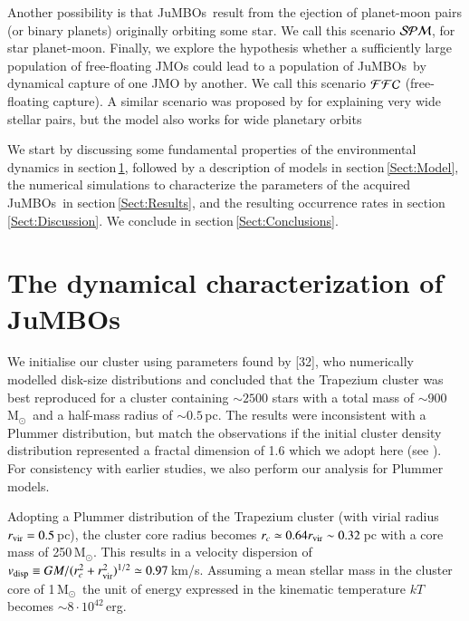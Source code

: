 \documentclass[submission,phys]{lib/SciPost}
\newcommand{\MSun}{\mbox{$\mathrm{{M}}_\odot$}}
\newcommand{\jumbos}{\mbox{JuMBOs}}
\begin{document}
Another possibility is that \jumbos\, result from the ejection of planet-moon
pairs (or binary planets) originally orbiting some star.  We call this 
scenario ${\cal SPM}$, for star planet-moon.
Finally, we explore the hypothesis whether a sufficiently large
population of free-floating JMOs could lead to a
population of \jumbos\, by dynamical capture of one JMO by another.
We call this scenario ${\cal FFC}$ (free-floating capture). A similar
scenario was proposed by \cite{2010MNRAS.404.1835K} for explaining
very wide stellar pairs, but the model also works for
wide planetary orbits \cite{2012ApJ...750...83P,2018MNRAS.473.1589G}

We start by discussing some fundamental properties of the
environmental dynamics in section\,\ref{Sect:Characterize}, followed
by a description of models in section\,\ref{Sect:Model}, the numerical
simulations to characterize the parameters of the acquired \jumbos\,
in section\,\ref{Sect:Results}, and the resulting occurrence rates in
section\,\ref{Sect:Discussion}. We conclude in
section\,\ref{Sect:Conclusions}.

\section{The dynamical characterization of \jumbos}\label{Sect:Characterize}

We initialise our cluster using parameters found by [32], who numerically 
modelled disk-size distributions and concluded that the Trapezium cluster was best 
reproduced for a cluster containing $\sim 2500$ stars with a total mass of 
$\sim 900$\,\MSun\, and a half-mass radius of $\sim 0.5$\,pc. The results were
inconsistent with a Plummer \cite{1911MNRAS..71..460P} distribution,
but match the observations if the initial cluster density distribution
represented a fractal dimension of 1.6 which we adopt here (see \cite{2004A&A...413..929G}).  
For consistency with earlier studies, we also perform our 
analysis for Plummer models.

Adopting a Plummer distribution of the Trapezium cluster (with virial
radius $r_{\rm vir} = 0.5$\,pc), the cluster core radius becomes $r_c \simeq
0.64r_{\rm vir} \sim 0.32$\,pc with a core mass of 250\,\MSun. This results 
in a velocity dispersion of $v_{\rm disp} \equiv GM/(r_c^2 +
r_{\rm vir}^2)^{1/2} \simeq 0.97$\,km/s. Assuming a mean stellar mass in
the cluster core of 1\,\MSun\, the unit of energy expressed in the
kinematic temperature $kT$ becomes $\sim 8 \cdot 10^{42}$\,erg.
\end{document}

